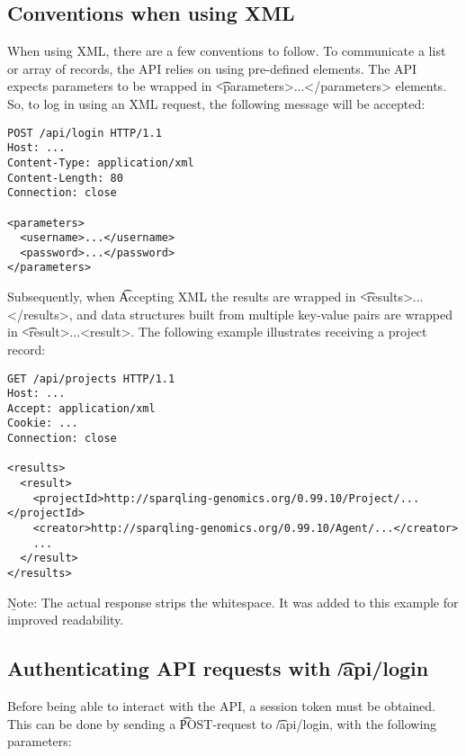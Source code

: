 \subsection{Conventions when using XML}

\begin{sloppypar}
  When using XML, there are a few conventions to follow.  To communicate a list
  or array of records, the API relies on using pre-defined elements. The API
  expects parameters to be wrapped in \t{<parameters>...</parameters>}
  elements.  So, to log in using an XML request, the following message will be
  accepted:
\end{sloppypar}

\begin{siderules}
\begin{verbatim}
POST /api/login HTTP/1.1
Host: ...
Content-Type: application/xml
Content-Length: 80
Connection: close

<parameters>
  <username>...</username>
  <password>...</password>
</parameters>
\end{verbatim}
\end{siderules}

  Subsequently, when \t{Accept}ing XML the results are wrapped in
  \t{<results>...</results>}, and data structures built from multiple
  key-value pairs are wrapped in \t{<result>...<result>}.  The
  following example illustrates receiving a project record:

\begin{siderules}
\begin{verbatim}
GET /api/projects HTTP/1.1
Host: ...
Accept: application/xml
Cookie: ...
Connection: close

<results>
  <result>
    <projectId>http://sparqling-genomics.org/0.99.10/Project/...</projectId>
    <creator>http://sparqling-genomics.org/0.99.10/Agent/...</creator>
    ...
  </result>
</results>
\end{verbatim}
\end{siderules}

\b{Note}: The actual response strips the whitespace.  It was added to
this example for improved readability.

\subsection{Authenticating API requests with \t{/api/login}}
\label{sec:api-login}

  Before being able to interact with the API, a session token must be obtained.
  This can be done by sending a \t{POST}-request to \t{/api/login},
  with the following parameters:

